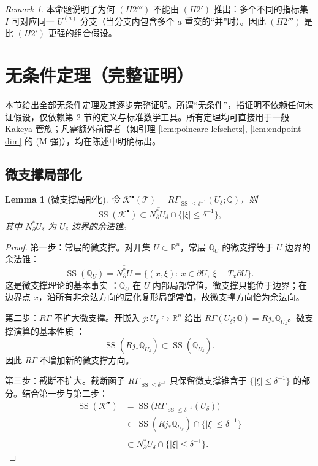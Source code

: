 \documentclass[11pt,a4paper]{article}
\newtheorem{lemma}[theorem]{Lemma}
\theoremstyle{remark}
\newtheorem{remark}[theorem]{Remark}
\begin{document}
	\begin{remark}
		本命题说明了为何 $(H2''')$ 不能由 $(H2')$ 推出：多个不同的指标集 $I$ 可对应同一 $U^{(a)}$ 分支（当分支内包含多个 $a$ 重交的“并”时）。因此 $(H2''')$ 是比 $(H2')$ 更强的组合假设。
	\end{remark}
	
	\section{无条件定理（完整证明）}
	\label{sec:uncond}
	本节给出全部无条件定理及其逐步完整证明。所谓“无条件”，指证明不依赖任何未证假设，仅依赖第 2 节的定义与标准数学工具。所有定理均可直接用于一般 Kakeya 管族；凡需额外前提者（如引理 \ref{lem:poincare-lefschetz}, \ref{lem:endpoint-dim} 的 (M‑强)），均在陈述中明确标出。
	
	\subsection{微支撑局部化}
	\begin{lemma}[微支撑局部化]
		\label{lem:microloc}
		令 $\mathcal K^\bullet(\mathcal T)=R\Gamma_{\operatorname{SS}\le\delta^{-1}}(U_\delta;\mathbb Q)$，则
		\[
		\operatorname{SS}(\mathcal K^\bullet)\subset\overline{N^*_{\partial}U_\delta}\cap\{|\xi|\le\delta^{-1}\},
		\]
		其中 $N^*_{\partial}U_\delta$ 为 $U_\delta$ 边界的余法锥。
	\end{lemma}
	
	\begin{proof}
		第一步：常层的微支撑。对开集 $U\subset\mathbb R^n$，常层 $\mathbb Q_U$ 的微支撑等于 $U$ 边界的余法锥：
		\[
		\operatorname{SS}(\mathbb Q_U)=\overline{N^*_{\partial}U}
		=\overline{\{(x,\xi):\ x\in\partial U,\ \xi\perp T_x\partial U\}}.
		\]
		这是微支撑理论的基本事实 \cite{KashiwaraSchapira}：$\mathbb Q_U$ 在 $U$ 内部局部常值，微支撑只能位于边界；在边界点 $x$，沿所有非余法方向的层化复形局部常值，故微支撑方向恰为余法向。
		
		第二步：$R\Gamma$ 不扩大微支撑。开嵌入 $j:U_\delta\hookrightarrow\mathbb R^n$ 给出 $R\Gamma(U_\delta;\mathbb Q)=Rj_*\mathbb Q_{U_\delta}$。微支撑演算的基本性质 \cite{KashiwaraSchapira}：
		\[
		\operatorname{SS}(Rj_*\mathbb Q_{U_\delta})\subset\operatorname{SS}(\mathbb Q_{U_\delta}).
		\]
		因此 $R\Gamma$ 不增加新的微支撑方向。
		
		第三步：截断不扩大。截断函子 $R\Gamma_{\operatorname{SS}\le\delta^{-1}}$ 只保留微支撑锥含于 $\{|\xi|\le\delta^{-1}\}$ 的部分。结合第一步与第二步：
		\begin{align*}
			\operatorname{SS}(\mathcal K^\bullet)
			&=\operatorname{SS}\bigl(R\Gamma_{\operatorname{SS}\le\delta^{-1}}(U_\delta)\bigr)\\
			&\subset\operatorname{SS}(Rj_*\mathbb Q_{U_\delta})\cap\{|\xi|\le\delta^{-1}\}\\
			&\subset\overline{N^*_{\partial}U_\delta}\cap\{|\xi|\le\delta^{-1}\}.
		\end{align*}
	\end{proof}
	
\end{document}
